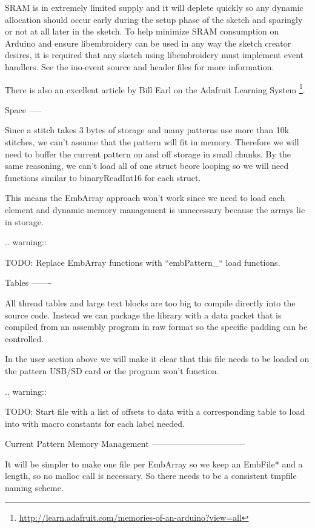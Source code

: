 \documentclass[a4paper]{report}
\begin{document}
SRAM is in extremely limited supply and it will deplete quickly so any
dynamic allocation should occur early during the setup phase of the
sketch and sparingly or not at all later in the sketch. To help minimize
SRAM consumption on Arduino and ensure libembroidery can be used in any
way the sketch creator desires, it is required that any sketch using
libembroidery must implement event handlers. See the ino-event source
and header files for more information.

There is also an excellent article by Bill Earl on the Adafruit Learning
System
\footnote{\url{http://learn.adafruit.com/memories-of-an-arduino?view=all}}.

Space
-----

Since a stitch takes 3 bytes of storage and many patterns use more than
10k stitches, we can't assume that the pattern will fit in memory. Therefore
we will need to buffer the current pattern on and off storage in small
chunks. By the same reasoning, we can't load all of one struct beore
looping so we will need functions similar to binaryReadInt16 for each
struct.

This means the EmbArray approach won't work since we need to load
each element and dynamic memory management is unnecessary because
the arrays lie in storage.

.. warning::

   TODO: Replace EmbArray functions with ``embPattern\_`` load functions.

Tables
-------

All thread tables and large text blocks are too big to compile directly
into the source code. Instead we can package the library with a data packet
that is compiled from an assembly program in raw format so the specific
padding can be controlled.

In the user section above we will make it clear that this file
needs to be loaded on the pattern USB/SD card or the program won't function.

.. warning::

   TODO: Start file with a list of offsets to data with a corresponding table
   to load into with macro constants for each label needed.

Current Pattern Memory Management
---------------------------------

It will be simpler to make one file per EmbArray so we keep an EmbFile*
and a length, so no malloc call is necessary. So there needs to be a consistent
tmpfile naming scheme.
\end{document}
